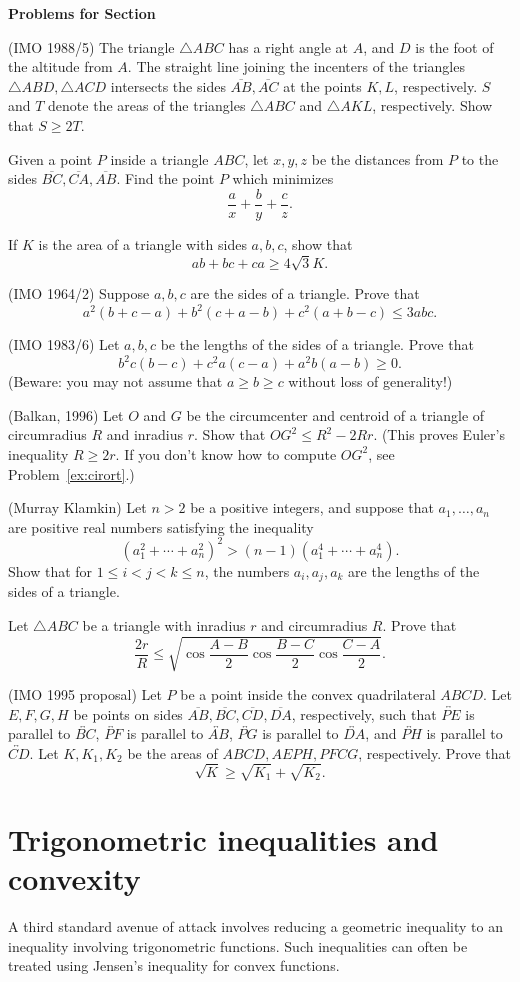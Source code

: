 \documentclass[12pt]{book}
\newcounter{exc}
\numberwithin{exc}{section}
\numberwithin{figure}{section}
\newenvironment{exer}{\vspace{0.1in}
\noindent \textbf{Problems for Section~\thesection} \vspace{0.1in}
\begin{list}{\arabic{exc}.}{\usecounter{exc}}}{\end{list}}
\numberwithin{equation}{theorem}
\def\ii{\item}
\def\line#1{\overleftrightarrow{#1}}
\def\seg#1{\overline{#1}}
\begin{document}
\begin{exer}
\ii
(IMO 1988/5)
The triangle $\triangle
ABC$ has a right angle at $A$, and $D$ is the foot of
the altitude from $A$. The straight line joining the incenters of the 
triangles $\triangle ABD, \triangle ACD$ 
intersects the sides $\seg{AB}, \seg{AC}$ at the points
$K,L$, respectively. $S$ and $T$ denote the areas of the triangles 
$\triangle ABC$
and $\triangle AKL$, respectively. Show that $S \geq 2T$.
\ii
Given a point $P$ inside a triangle $ABC$, let $x,y,z$ be the 
distances from $P$ to the sides $\seg{BC}, \seg{CA}, \seg{AB}$. 
Find the point $P$ which 
minimizes
\[
\frac{a}{x} + \frac{b}{y} + \frac{c}{z}.
\] 
\ii
If $K$ is the area of a triangle with sides $a,b,c$, show that
\[
ab + bc + ca \geq 4 \sqrt{3} K.
\]
\ii
(IMO 1964/2) Suppose $a,b,c$ are the sides of a triangle. Prove that
\[
a^{2}(b+c-a) + b^{2}(c+a-b) + c^{2}(a+b-c) \leq 3abc.
\]
\ii
(IMO 1983/6)
Let $a,b,c$ be the lengths of the sides of a triangle. Prove that
\[
b^2c(b-c) + c^2a(c-a) + a^2b(a-b) \geq 0.
\]
(Beware: you may not assume that $a\geq b \geq c$ without loss of 
generality!)
\ii
(Balkan, 1996)
Let $O$ and $G$ be the circumcenter and centroid of a triangle of
circumradius $R$ and inradius $r$. Show that $OG^2 \leq R^2 -
2Rr$. (This proves Euler's inequality $R \geq 2r$. 
 If you don't know
how to compute $OG^2$, see Problem~\ref{ex:cirort}.)
\ii
(Murray Klamkin) 
Let $n > 2$ be a positive integers, and suppose that $a_1, \dots, a_n$
are positive real numbers satisfying the inequality
\[
(a_1^2 + \cdots + a_n^2)^2 > (n-1) (a_1^4 + \cdots + a_n^4).
\]
Show that for $1 \leq i < j < k \leq n$, the numbers $a_i, a_j, a_k$
are the lengths of the sides of a triangle.
\ii \label{ex:cotident}
Let $\triangle 
ABC$ be a triangle with inradius $r$ and circumradius $R$. Prove 
that
\[
\frac{2r}{R} \leq \sqrt{\cos \frac{A-B}{2} \cos \frac{B-C}{2} \cos 
\frac{C-A}{2}}.
\]
\ii \label{ex:quadineq}
(IMO 1995 proposal)
Let $P$ be a point inside the convex quadrilateral $ABCD$. Let 
$E,F,G,H$ be points on sides $\seg{AB},\seg{BC},\seg{CD},\seg{DA}$, 
respectively, such that 
$\line{PE}$ is parallel to $\line{BC}$, 
$\line{PF}$ is parallel to $\line{AB}$, 
$\line{PG}$ is parallel to $\line{DA}$, 
and $\line{PH}$ is parallel to $\line{CD}$.
Let $K, K_{1}, K_{2}$ be the 
areas of $ABCD, AEPH, PFCG$, respectively. Prove that
\[
\sqrt{K} \geq \sqrt{K_{1}} + \sqrt{K_{2}}.
\]
\end{exer}

\section{Trigonometric inequalities and convexity}
A third standard avenue of attack involves reducing a geometric 
inequality to an inequality involving 
trigonometric functions. Such inequalities can often be treated using 
Jensen's inequality for convex functions.
\end{document}
